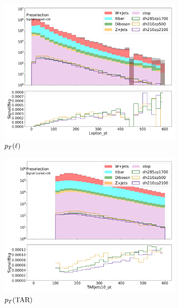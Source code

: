 \begin{figure}[htbp]
\begin{subfigure}{0.49\textwidth}
      \includegraphics[width = 0.98\textwidth]{Figures/appendix/Preselection/Lepton_pt.png}
      \caption{$p_T(\ell)$}
      \end{subfigure}
      \begin{subfigure}{0.49\textwidth}
      \includegraphics[width = 0.98\textwidth]{Figures/appendix/Preselection/TARJets10_pt.png}
      \caption{$p_T(\text{TAR})$}
      \end{subfigure}
      \begin{subfigure}{0.49\textwidth}

\end{subfigure}
\end{figure}
